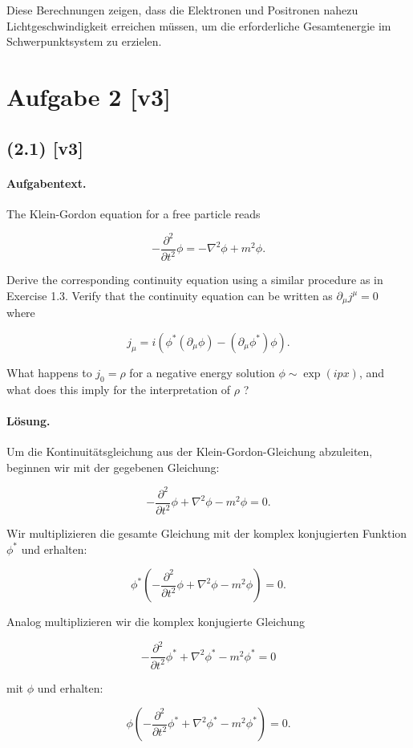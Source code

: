\documentclass[11pt,a4paper]{article}
\begin{document}
Diese Berechnungen zeigen, dass die Elektronen und Positronen nahezu Lichtgeschwindigkeit erreichen müssen, um die erforderliche Gesamtenergie im Schwerpunktsystem zu erzielen.

\section*{Aufgabe 2 [v3]}
\subsection*{(2.1) [v3]}
\paragraph{Aufgabentext.}
The Klein-Gordon equation for a free particle reads

$$
-\frac{\partial^2}{\partial t^2} \phi=-\nabla^2 \phi+m^2 \phi .
$$


Derive the corresponding continuity equation using a similar procedure as in Exercise 1.3.
Verify that the continuity equation can be written as $\partial_\mu j^\mu=0$ where

$$
j_\mu=i\left(\phi^*\left(\partial_\mu \phi\right)-\left(\partial_\mu \phi^*\right) \phi\right) .
$$


What happens to $j_0=\rho$ for a negative energy solution $\phi \sim \exp (i p x)$, and what does this imply for the interpretation of $\rho$ ?

\paragraph{Lösung.}
Um die Kontinuitätsgleichung aus der Klein-Gordon-Gleichung abzuleiten, beginnen wir mit der gegebenen Gleichung:

\[
-\frac{\partial^2}{\partial t^2} \phi + \nabla^2 \phi - m^2 \phi = 0.
\]

Wir multiplizieren die gesamte Gleichung mit der komplex konjugierten Funktion \(\phi^*\) und erhalten:

\[
\phi^* \left(-\frac{\partial^2}{\partial t^2} \phi + \nabla^2 \phi - m^2 \phi \right) = 0.
\]

Analog multiplizieren wir die komplex konjugierte Gleichung

\[
-\frac{\partial^2}{\partial t^2} \phi^* + \nabla^2 \phi^* - m^2 \phi^* = 0
\]

mit \(\phi\) und erhalten:

\[
\phi \left(-\frac{\partial^2}{\partial t^2} \phi^* + \nabla^2 \phi^* - m^2 \phi^* \right) = 0.
\]
\end{document}
